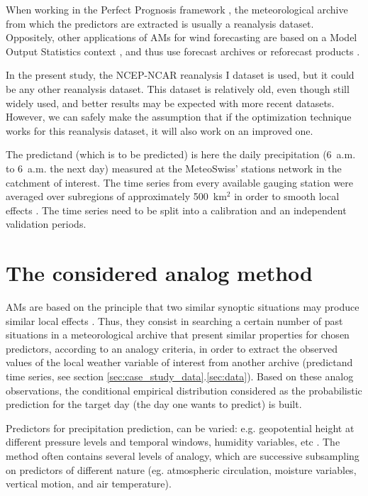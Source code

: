 \documentclass{ametsoc}
\begin{document}
When working in the Perfect Prognosis framework \citep{Klein1963}, the meteorological archive from which the predictors are extracted is usually a reanalysis dataset. Oppositely, other applications of AMs for wind forecasting are based on a Model Output Statistics context \citep[MOS, see][]{Glahn1972}, and thus use forecast archives or reforecast products \citep[e.g.][]{DelleMonache2013, DelleMonache2011, Alessandrini2015, Junk2015, Junk2015c}.

In the present study, the NCEP-NCAR reanalysis I dataset \citep[6-hourly, 17 pressure levels at a resolution of 2.5\degree, see][]{Kalnay1996} is used, but it could be any other reanalysis dataset. This dataset is relatively old, even though still widely used, and better results may be expected with more recent datasets. However, we can safely make the assumption that if the optimization technique works for this reanalysis dataset, it will also work on an improved one.

The predictand (which is to be predicted) is here the daily precipitation (6~a.m. to 6~a.m. the next day) measured at the MeteoSwiss' stations network in the catchment of interest. The time series from every available gauging station were averaged over subregions of approximately 500~km$^{2}$ \citep[see][for the details]{Horton2012a} in order to smooth local effects \citep{Obled2002, Marty2012}. The time series need to be split into a calibration and an independent validation periods.


\section{The considered analog method}
\label{sec:am}

AMs are based on the principle that two similar synoptic situations may produce similar local effects \citep{Lorenz1956, Lorenz1969}. Thus, they consist in searching a certain number of past situations in a meteorological archive that present similar properties for chosen predictors, according to an analogy criteria, in order to extract the observed values of the local weather variable of interest from another archive (predictand time series, see section \ref{sec:case_study_data}.\ref{sec:data}). Based on these analog observations, the conditional empirical distribution considered as the probabilistic prediction for the target day (the day one wants to predict) is built.

Predictors for precipitation prediction, can be varied: e.g. geopotential height at different pressure levels and temporal windows, humidity variables, etc \citep[see][for a more detailed list of predictors]{BenDaoud2016}. The method often contains several levels of analogy, which are successive subsampling on predictors of different nature (eg. atmospheric circulation, moisture variables, vertical motion, and air temperature). 
\end{document}
